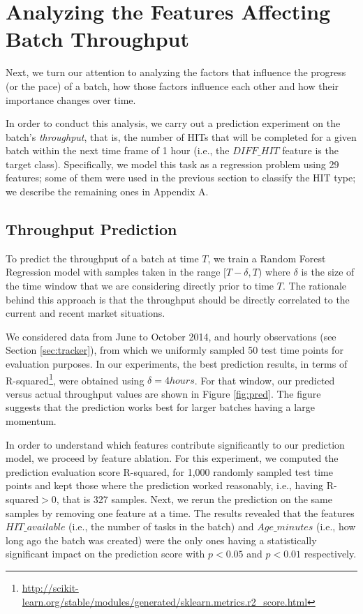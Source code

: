 \section{Analyzing the Features Affecting Batch Throughput}
\label{sec:throughput}
Next, we turn our attention to analyzing the factors that influence the progress (or the pace) of a batch, how those factors influence each other and how their importance changes over time. 

In order to conduct this analysis, we carry out a prediction experiment on the batch's \emph{throughput}, that is, the number of HITs that  will be completed for a given batch within the next time frame of 1 hour (i.e.,  the $DIFF\_HIT$ feature is the target class).
Specifically, we model this task as a regression problem using 29 features; some of them were used in the previous section to classify the HIT type; we describe the remaining ones in Appendix A.

\subsection{Throughput Prediction}

To predict the throughput of a batch at time $T$, we train a Random Forest Regression model with samples taken in the range $[T-\delta, T)$ where $\delta$ is the size of the time window that we are considering directly prior to time $T$. 
%
The rationale behind this approach is that the throughput should be directly correlated to the current and recent market situations. 

We considered  data from June to October 2014, and hourly observations (see Section \ref{sec:tracker}), from which we uniformly sampled 50 test time points for evaluation purposes. In our experiments, the best prediction results, in terms of R-squared\footnote{\url{http://scikit-learn.org/stable/modules/generated/sklearn.metrics.r2_score.html}}, were obtained using $\delta=4hours$. For that window, our predicted versus actual throughput values are shown in Figure \ref{fig:pred}. 
%
The figure suggests that the prediction works best for larger batches having a large momentum.

In order to understand which features contribute significantly to our prediction model, we proceed by feature ablation. For this experiment, we computed the prediction evaluation score R-squared, for 1,000 randomly sampled test time points and kept those where the prediction worked reasonably, i.e., having R-squared$>0$, that is 327 samples. Next, we rerun the prediction on the same samples by removing one feature at a time. The results revealed that the features $HIT\_available$ (i.e., the number of tasks in the batch) and $Age\_minutes$ (i.e., how long ago the batch was created) were the only ones having a statistically significant impact on the prediction score with $p < 0.05$ and $p < 0.01$ respectively.


